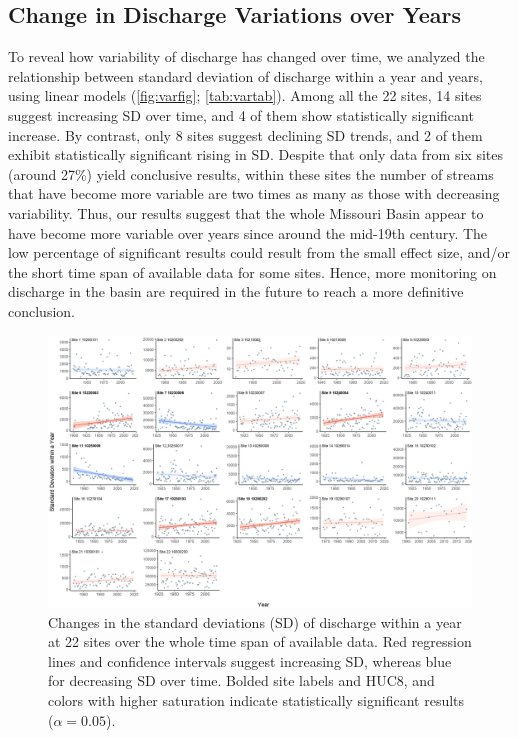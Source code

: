 \documentclass[12pt,]{article}
\makeatletter
\def\maxwidth{\ifdim\Gin@nat@width>\linewidth\linewidth\else\Gin@nat@width\fi}
\makeatother
\begin{document}
\hypertarget{change-in-discharge-variations-over-years}{%
\subsection{Change in Discharge Variations over
Years}\label{change-in-discharge-variations-over-years}}

To reveal how variability of discharge has changed over time, we
analyzed the relationship between standard deviation of discharge within
a year and years, using linear models (\autoref{fig:varfig};
\autoref{tab:vartab}). Among all the 22 sites, 14 sites suggest
increasing SD over time, and 4 of them show statistically significant
increase. By contrast, only 8 sites suggest declining SD trends, and 2
of them exhibit statistically significant rising in SD. Despite that
only data from six sites (around 27\%) yield conclusive results, within
these sites the number of streams that have become more variable are two
times as many as those with decreasing variability. Thus, our results
suggest that the whole Missouri Basin appear to have become more
variable over years since around the mid-19th century. The low
percentage of significant results could result from the small effect
size, and/or the short time span of available data for some sites.
Hence, more monitoring on discharge in the basin are required in the
future to reach a more definitive conclusion.

\begin{figure}
\includegraphics[width=\maxwidth]{../Figures/sd_year} \caption{\label{fig:varfig} Changes in the standard deviations (SD) of discharge within a year at 22 sites over the whole time span of available data. Red regression lines and confidence intervals suggest increasing SD, whereas blue for decreasing SD over time. Bolded site labels and HUC8, and colors with higher saturation indicate statistically significant results ($\alpha = 0.05$).}\label{fig:varfig}
\end{figure}
\end{document}
